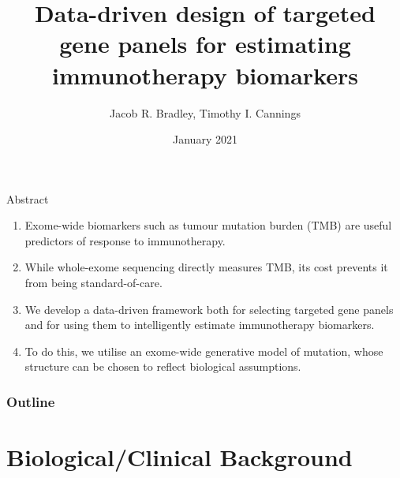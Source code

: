 \documentclass{beamer}
\title[Data-driven targeted gene panels]{Data-driven design of targeted gene panels for estimating immunotherapy biomarkers}
\author[Bradley and Cannings]{Jacob R. Bradley, Timothy I. Cannings}
\date{January 2021}
\begin{document}
\begin{frame}
\titlepage
\end{frame}

\begin{frame}{Abstract}
\begin{enumerate}[I]
    \item Exome-wide biomarkers such as tumour mutation burden (TMB) are useful predictors of response to immunotherapy.
    \item While whole-exome sequencing directly measures TMB, its cost prevents it from being standard-of-care.
    \item We develop a data-driven framework both for selecting targeted gene panels and for using them to intelligently estimate immunotherapy biomarkers.
    \item To do this, we utilise an exome-wide generative model of mutation, whose structure can be chosen to reflect biological assumptions.
\end{enumerate}
\end{frame}


\begin{frame}
\frametitle{Outline}
\tableofcontents
\end{frame}

\section{Biological/Clinical Background}
\end{document}
